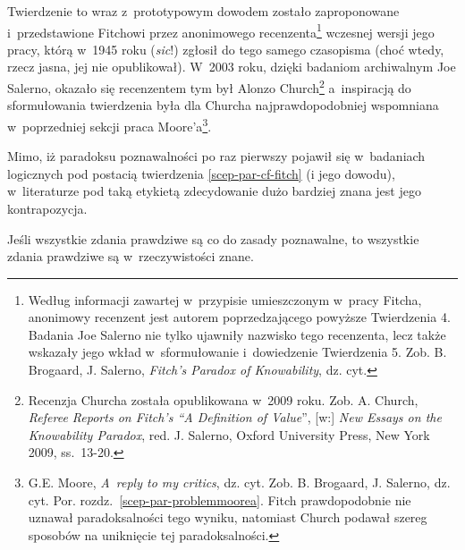 Twierdzenie to wraz z~prototypowym dowodem zostało zaproponowane i~przedstawione Fitchowi przez anonimowego recenzenta\footnote{Według informacji zawartej w~przypisie umieszczonym w~pracy Fitcha, anonimowy recenzent jest autorem poprzedzającego powyższe Twierdzenia 4. Badania Joe Salerno nie tylko ujawniły nazwisko tego recenzenta, lecz także wskazały jego wkład w~sformułowanie i~dowiedzenie Twierdzenia 5. Zob. B. Brogaard, J. Salerno, \textit{Fitch's Paradox of Knowability}, dz. cyt.} wczesnej wersji jego pracy, którą w~1945 roku (\textit{sic}!) zgłosił do tego samego czasopisma (choć wtedy, rzecz jasna, jej nie opublikował). W~2003 roku, dzięki badaniom archiwalnym Joe Salerno, okazało się recenzentem tym był Alonzo Church\footnote{Recenzja Churcha została opublikowana w~2009 roku. Zob. A. Church, \textit{Referee Reports on Fitch's ``A Definition of Value}'', [w:] \textit{New Essays on the Knowability Paradox}, red. J. Salerno, Oxford University Press, New York 2009, ss.~13-20.} a~inspiracją do sformułowania twierdzenia była dla Churcha najprawdopodobniej wspomniana w~poprzedniej sekcji praca Moore'a\footnote{G.E. Moore, \textit{A~reply to my critics}, dz. cyt. Zob. B. Brogaard, J. Salerno, dz. cyt. Por. rozdz.~\ref{scep-par-problemmoorea}. Fitch prawdopodobnie nie uznawał paradoksalności tego wyniku, natomiast Church podawał szereg sposobów na uniknięcie tej paradoksalności.}.

Mimo, iż paradoksu poznawalności po raz pierwszy pojawił się w~badaniach logicznych pod postacią twierdzenia \ref{scep-par-cf-fitch} (i jego dowodu), w~literaturze pod taką etykietą zdecydowanie dużo bardziej znana jest jego kontrapozycja.
\begin{tw}\label{scep-par-cf-parpozn}
Jeśli wszystkie zdania prawdziwe są co do zasady poznawalne, to wszystkie zdania prawdziwe są w~rzeczywistości znane.
\end{tw}

